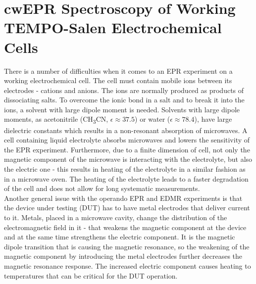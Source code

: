 \section{cwEPR Spectroscopy of Working TEMPO-Salen Electrochemical Cells}
There is a number of difficulties when it comes to an EPR experiment on a working electrochemical cell. The cell must contain mobile ions between its electrodes - cations and anions. The ions are normally produced as products of dissociating salts. To overcome the ionic bond in a salt and to break it into the ions, a solvent with large dipole moment is needed. Solvents with large dipole moments, as acetonitrile (CH\textsubscript{3}CN, $\epsilon\approx 37.5$) or water ($\epsilon\approx78.4$), have large dielectric constants which results in a non-resonant absorption of microwaves. A cell containing liquid electrolyte absorbs microwaves and lowers the sensitivity of the EPR experiment. Furthermore, due to a finite dimension of cell, not only the magnetic component of the microwave is interacting with the electrolyte, but also the electric one - this results in heating of the electrolyte in a similar fashion as in a microwave oven. The heating of the electrolyte leads to a faster degradation of the cell and does not allow for long systematic measurements.\\
Another general issue with the operando EPR and EDMR experiments is that the device under testing (DUT) has to have metal electrodes that deliver current to it. Metals, placed in a microwave cavity, change the distribution of the electromagnetic field in it - that weakens the magnetic component at the device and at the same time strengthens the electric component. It is the magnetic dipole transition that is causing the magnetic resonance, so the weakening of the magnetic component by introducing the metal electrodes further decreases the magnetic resonance response. The increased electric component causes heating to temperatures that can be critical for the DUT operation.

